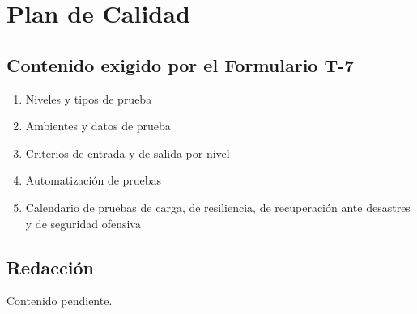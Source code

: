 \section{Plan de Calidad}

%

\subsection{Contenido exigido por el Formulario T-7}

\begin{enumerate}
    \item Niveles y tipos de prueba
    \item Ambientes y datos de prueba
    \item Criterios de entrada y de salida por nivel
    \item Automatización de pruebas
    \item Calendario de pruebas de carga, de resiliencia, de recuperación ante desastres y de seguridad ofensiva
\end{enumerate}

\subsection{Redacción}

Contenido pendiente.
